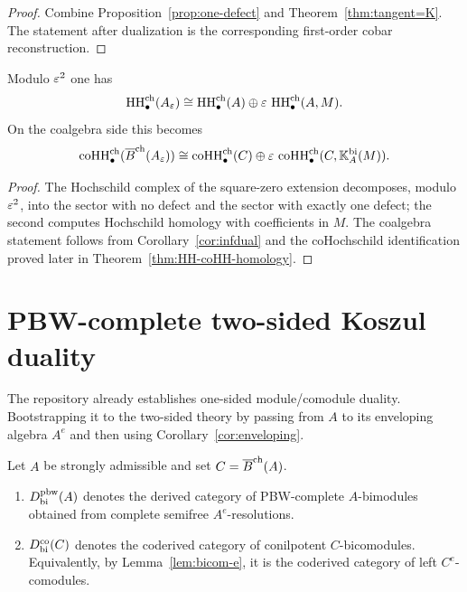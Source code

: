 \begin{proof}
Combine Proposition~\ref{prop:one-defect} and Theorem~\ref{thm:tangent=K}. The statement after
dualization is the corresponding first-order cobar reconstruction.
\end{proof}

\begin{proposition}
Modulo $\varepsilon^2$ one has
\[
\operatorname{HH}^{\mathrm{ch}}_\bullet(A_\varepsilon)
\cong
\operatorname{HH}^{\mathrm{ch}}_\bullet(A)\oplus \varepsilon\, \operatorname{HH}^{\mathrm{ch}}_\bullet(A,M).
\]
On the coalgebra side this becomes
\[
\operatorname{coHH}^{\mathrm{ch}}_\bullet(\overline{B}^{\mathrm{ch}}(A_\varepsilon))
\cong
\operatorname{coHH}^{\mathrm{ch}}_\bullet(C)\oplus \varepsilon\,
\operatorname{coHH}^{\mathrm{ch}}_\bullet(C,\mathbb{K}_A^{\mathrm{bi}}(M)).
\]
\end{proposition}

\begin{proof}
The Hochschild complex of the square-zero extension decomposes, modulo $\varepsilon^2$, into the sector with
no defect and the sector with exactly one defect; the second computes Hochschild homology with
coefficients in $M$. The coalgebra statement follows from
Corollary~\ref{cor:infdual} and the coHochschild identification proved later in
Theorem~\ref{thm:HH-coHH-homology}.
\end{proof}

\section{PBW-complete two-sided Koszul duality}

The repository already establishes one-sided module/comodule duality. Bootstrapping it to the
two-sided theory by passing from $A$ to its enveloping algebra $A^e$ and then using
Corollary~\ref{cor:enveloping}.

\begin{definition}
Let $A$ be strongly admissible and set $C=\overline{B}^{\mathrm{ch}}(A)$.
\begin{enumerate}[label=(\alph*)]
\item $D^{\mathrm{pbw}}_{\mathrm{bi}}(A)$ denotes the derived category of PBW-complete $A$-bimodules obtained
from complete semifree $A^e$-resolutions.

\item $D^{\mathrm{co}}_{\mathrm{bi}}(C)$ denotes the coderived category of conilpotent $C$-bicomodules.
Equivalently, by Lemma~\ref{lem:bicom-e}, it is the coderived category of left $C^e$-comodules.
\end{enumerate}
\end{definition}

